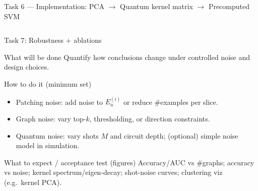 \documentclass[aspectratio=169,xcolor={dvipsnames}]{beamer}
\begin{document}
\begin{frame}[fragile,shrink=43]{Task 6 — Implementation: PCA $\rightarrow$ Quantum kernel matrix $\rightarrow$ Precomputed SVM}
\begin{columns}[T,onlytextwidth]
\end{columns}
\end{frame}



\begin{frame}[shrink=20]{Task 7: Robustness + ablations}
\small
\begin{block}{What will be done}
Quantify how conclusions change under controlled noise and design choices.
\end{block}

\begin{block}{How to do it (minimum set)}
\begin{itemize}\setlength\itemsep{3pt}
\item Patching noise: add noise to $E_u^{(i)}$ or reduce \#examples per slice.
\item Graph noise: vary top-$k$, thresholding, or direction constraints.
\item Quantum noise: vary shots $M$ and circuit depth; (optional) simple noise model in simulation.
\end{itemize}
\end{block}

\begin{block}{What to expect / acceptance test (figures)}
Accuracy/AUC vs \#graphs; accuracy vs noise; kernel spectrum/eigen-decay; shot-noise curves; clustering viz (e.g.\ kernel PCA).
\end{block}
\end{frame}
\end{document}
